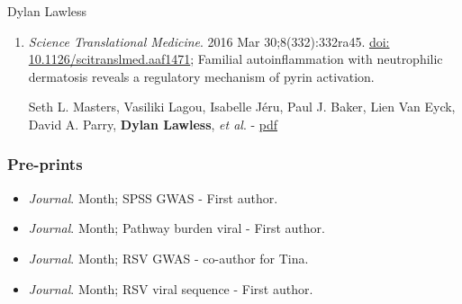\documentclass[12pt,a4paper]{article}
\begin{document}
\begin{cv}{Dylan Lawless}
\begin{enumerate}
\item \emph{Science Translational Medicine}. 2016 Mar 30;8(332):332ra45. 
\href{https://doi.org/10.1126/scitranslmed.aaf1471}{doi: 10.1126/scitranslmed.aaf1471};
Familial autoinflammation with neutrophilic dermatosis reveals a regulatory mechanism of pyrin activation.

Seth L. Masters, Vasiliki Lagou, Isabelle Jéru, Paul J. Baker, Lien Van Eyck, David A. Parry, \textbf{Dylan Lawless}, \textit{et al}.
- \href{https://dylanlawless.github.io/resume/pdf/2016MastersScienceTM_Familial\%20autoinflammation\%20with\%20neutrophilic\%20dermatosis\%20reveals\%20a\%20regulatory\%20mechanism\%20of\%20pyrin\%20activation\%20-\%20Science\%20Translational\%20Medicine.pdf}{pdf}
\end{enumerate}

\subsubsection*{Pre-prints}
\begin{itemize}
\item  \emph{Journal}. Month; SPSS GWAS - First author.
\item  \emph{Journal}. Month; Pathway burden viral - First author.
\item  \emph{Journal}. Month; RSV GWAS - co-author for Tina.
\item  \emph{Journal}. Month; RSV viral sequence - First author.
\end{itemize}





\end{cv}
\end{document}

